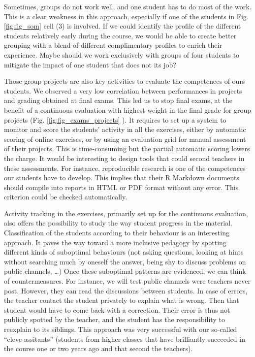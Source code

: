 \documentclass[
]{article}
\begin{document}
Sometimes, groups do not work well, and one student has to do most of
the work. This is a clear weakness in this approach, especially if one
of the students in Fig. \ref {fig:fig_som} cell (3) is involved. If we
could identify the profile of the different students relatively early
during the course, we would be able to create better grouping with a
blend of different complimentary profiles to enrich their experience.
Maybe should we work exclusively with groups of four students to
mitigate the impact of one student that does not its job?

Those group projects are also key activities to evaluate the competences
of ours students. We observed a very low correlation between
performances in projects and grading obtained at final exams. This led
us to stop final exams, at the benefit of a continuous evaluation with
highest weight in the final grade for group projects (Fig.
\ref {fig:fig_exams_projects} ). It requires to set up a system to
monitor and score the students' activity in all the exercises, either by
automatic scoring of online exercises, or by using an evaluation grid
for manual assessment of their projects. This is time-consuming but the
partial automatic scoring lowers the charge. It would be interesting to
design tools that could second teachers in these assessments. For
instance, reproducible research is one of the competences our students
have to develop. This implies that their R Markdown documents should
compile into reports in HTML or PDF format without any error. This
criterion could be checked automatically.

Activity tracking in the exercises, primarily set up for the continuous
evaluation, also offers the possibility to study the way student
progress in the material. Classification of the students according to
their behaviour is an interesting approach. It paves the way toward a
more inclusive pedagogy by spotting different kinds of suboptimal
behaviours (not asking questions, looking at hints without searching
much by oneself the answer, being shy to discuss problems on public
channels, \ldots) Once these suboptimal patterns are evidenced, we can
think of countermeasures. For instance, we will test public channels
were teachers never post. However, they can read the discussions between
students. In case of errors, the teacher contact the student privately
to explain what is wrong. Then that student would have to come back with
a correction. Their error is thus not publicly spotted by the teacher,
and the student has the responsibility to reexplain to its siblings.
This approach was very successful with our so-called ``eleve-assitants''
(students from higher classes that have brilliantly succeeded in the
course one or two years ago and that second the teachers).
\end{document}
